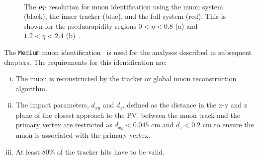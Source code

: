 \begin{figure}[t]
\centering
     \\
\caption{The $p_{T}$ resolution for muon identification using the muon system (black), the inner tracker (blue), and the full system (red). This is shown for the pseduorapidity regions $0 < \eta < 0.8$ (a) and  $1.2 < \eta < 2.4$ (b)~\cite{CMS_Setup}.}
\label{fig:muon_eff}
\end{figure}

The \texttt{Medium} muon identification~\cite{CMS:2018rym} is used for the analyses described in subsequent chapters.
The requirements for this identification are:
\begin{enumerate}[i)]
\item The muon is reconstructed by the tracker or global muon reconstruction algorithm.
\item The impact parameters, $d_{xy}$ and $d_{z}$, defined as the distance in the x-y and z plane of the closest approach to the \ac{PV}, between the muon track and the primary vertex are restricted as $d_{xy}<0.045$ cm and $d_{z}<0.2$ cm to ensure the muon is associated with the primary vertex.
\item At least 80\% of the tracker hits have to be valid.
\end{enumerate}

